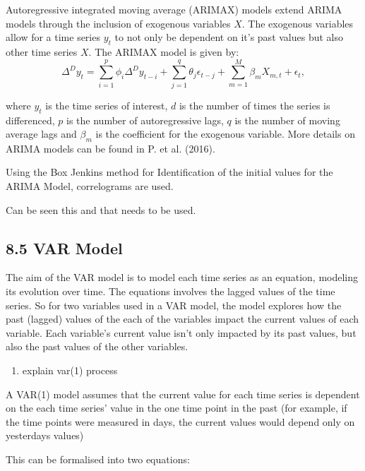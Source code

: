 \documentclass[
]{article}
\providecommand{\tightlist}{%
  \setlength{\itemsep}{0pt}\setlength{\parskip}{0pt}}
\begin{document}
Autoregressive integrated moving average (ARIMAX) models extend ARIMA
models through the inclusion of exogenous variables \(X\). The exogenous
variables allow for a time series \(y_t\) to not only be dependent on
it's past values but also other time series \(X\). The ARIMAX model is
given by: \begin{equation}
\Delta^{D}y_{t} = \sum^{p}_{i=1}\phi_{i}\Delta^{D}y_{t-i} + \sum^{q}_{j=1}\theta_{j}\epsilon_{t-j} + \sum^{M}_{m=1}\beta_{m}X_{m,t} + \epsilon_{t},
\end{equation}

where \(y_t\) is the time series of interest, \(d\) is the number of
times the series is differenced, \(p\) is the number of autoregressive
lags, \(q\) is the number of moving average lags and \(\beta_{m}\) is
the coefficient for the exogenous variable. More details on ARIMA models
can be found in P. et al. (2016).

Using the Box Jenkins method for Identification of the initial values
for the ARIMA Model, correlograms are used.

Can be seen this and that needs to be used.

\hypertarget{var-model}{%
\subsection{8.5 VAR Model}\label{var-model}}

The aim of the VAR model is to model each time series as an equation,
modeling its evolution over time. The equations involves the lagged
values of the time series. So for two variables used in a VAR model, the
model explores how the past (lagged) values of the each of the variables
impact the current values of each variable. Each variable's current
value isn't only impacted by its past values, but also the past values
of the other variables.

\begin{enumerate}
\def\labelenumi{\arabic{enumi}.}
\setcounter{enumi}{1}
\tightlist
\item
  explain var(1) process
\end{enumerate}

A VAR(1) model assumes that the current value for each time series is
dependent on the each time series' value in the one time point in the
past (for example, if the time points were measured in days, the current
values would depend only on yesterdays values)

This can be formalised into two equations:
\end{document}
